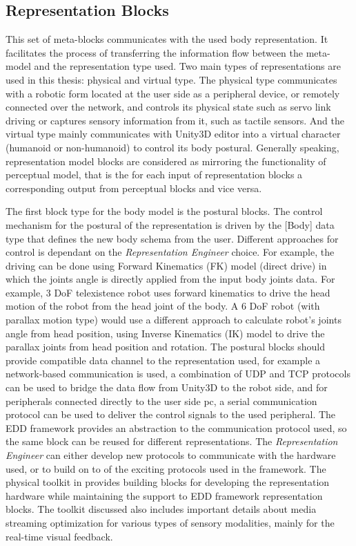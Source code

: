 \subsection{Representation Blocks}

This set of meta-blocks communicates with the used body representation. It facilitates the process of transferring the information flow between the meta-model and the representation type used. Two main types of representations are used in this thesis: physical and virtual type. The physical type communicates with a robotic form located at the user side as a peripheral device, or remotely connected over the network, and controls its physical state such as servo link driving or captures sensory information from it, such as tactile sensors. And the virtual type mainly communicates with Unity3D editor into a virtual character (humanoid or non-humanoid) to control its body postural. Generally speaking, representation model blocks are considered as mirroring the functionality of perceptual model, that is the for each input of representation blocks a corresponding output from perceptual blocks and vice versa.

The first block type for the body model is the postural blocks. The control mechanism for the postural of the representation is driven by the [Body] data type that defines the new body schema from the user. Different approaches for control is dependant on the \textit{Representation Engineer} choice. For example, the driving can be done using Forward Kinematics (FK) model (direct drive) in which the joints angle is directly applied from the input body joints data. For example, 3 DoF telexistence robot uses forward kinematics to drive the head motion of the robot from the head joint of the body. A 6 DoF robot (with parallax motion type) would use a different approach to calculate robot's joints angle from head position, using Inverse Kinematics (IK) model to drive the parallax joints from head position and rotation. The postural blocks should provide compatible data channel to the representation used, for example a network-based communication is used, a combination of UDP and TCP protocols can be used to bridge the data flow from Unity3D to the robot side, and for peripherals connected directly to the user side pc, a serial communication protocol can be used to deliver the control signals to the used peripheral. The EDD framework provides an abstraction to the communication protocol used, so the same block can be reused for different representations. The  \textit{Representation Engineer} can either develop new protocols to communicate with the hardware used, or to build on to of the exciting protocols used in the framework. The physical toolkit in  provides building blocks for developing the representation hardware while maintaining the support to EDD framework representation blocks. The toolkit discussed also includes important details about media streaming optimization for various types of sensory modalities, mainly for the real-time visual feedback. 

